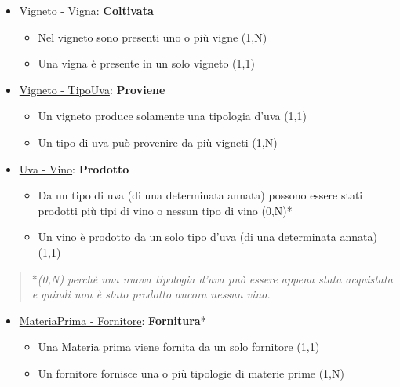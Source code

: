 \begin{itemize}
	\item \underline{Vigneto - Vigna}: \textbf{Coltivata}
	
	\begin{itemize}
		\item Nel vigneto sono presenti uno o più vigne (1,N)
		\item Una vigna è presente in un solo vigneto (1,1)
	\end{itemize}
	
\end{itemize}

\begin{itemize}
	\item \underline{Vigneto - TipoUva}: \textbf{Proviene}
	
	\begin{itemize}
		\item Un vigneto produce solamente una tipologia d'uva (1,1)
		\item Un tipo di uva può provenire da più vigneti (1,N)
	\end{itemize}
	
\end{itemize}

\begin{itemize}
	\item \underline{Uva - Vino}: \textbf{Prodotto}
	
	\begin{itemize}
		\item Da un tipo di uva (di una determinata annata) possono essere stati prodotti più tipi di vino o nessun tipo di vino (0,N)*
		\item Un vino è prodotto da un solo tipo d'uva (di una determinata annata) (1,1)
	\end{itemize}
	
\end{itemize}

\begin{verse}
	*\emph{(0,N) perchè una nuova tipologia d'uva può essere appena stata acquistata e quindi non è stato prodotto ancora nessun vino.}
\end{verse}


\begin{itemize}
	\item \underline{MateriaPrima - Fornitore}: \textbf{Fornitura}*
	
	\begin{itemize}
		\item Una Materia prima viene fornita da un solo fornitore (1,1)
		\item Un fornitore fornisce una o più tipologie di materie prime (1,N)
	\end{itemize}
	
\end{itemize}


